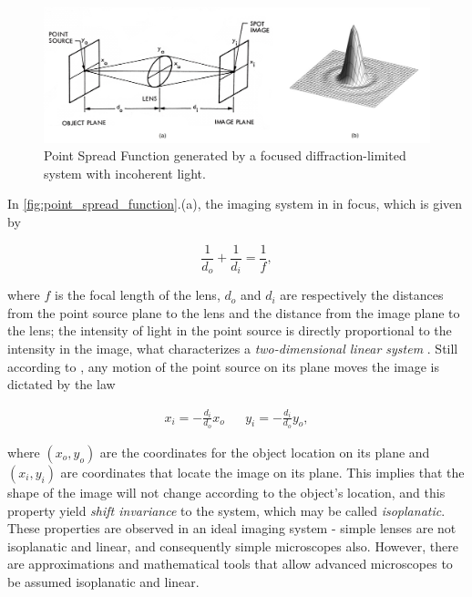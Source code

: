 \begin{figure}[htb]
	\centering
	\caption{\label{fig:point_spread_function} Point Spread Function generated by a focused diffraction-limited system with incoherent light.} 
	\begin{center}
	    \includegraphics[scale=0.235]{images/point_spread_function.jpeg}
	\end{center}
	\centering
\end{figure}

In \autoref{fig:point_spread_function}.(a), the imaging system in in focus, which is given by

\begin{equation}
\label{eqn:lens_focus}
\frac{1}{d_{o}} + \frac{1}{d_{i}} = \frac{1}{f},
\end{equation}

\noindent where $f$ is the focal length of the lens, $d_{o}$ and $d_{i}$ are respectively the distances from the point source plane to the lens and the distance from the image plane to the lens; the intensity of light in the point source is directly proportional to the intensity in the image, what characterizes a \emph{two-dimensional linear system} \cite{castleman1996digital}. Still according to , any motion of the point source on its plane moves the image is dictated by the law

\begin{align}
\label{eqn:isoplanatic_motion}
x_{i} = -\frac{d_{i}}{d_{o}}x_{o}
&&
y_{i} = -\frac{d_{i}}{d_{o}}y_{o},
\end{align}

\noindent where $(x_{o},y_{o})$ are the coordinates for the object location on its plane and $(x_{i},y_{i})$ are coordinates that locate the image on its plane. This implies that the shape of the image will not change according to the object's location, and this property yield \emph{shift invariance} to the system, which may be called \emph{isoplanatic}. These properties are observed in an ideal imaging system - simple lenses are not isoplanatic and linear, and  consequently simple microscopes also. However, there are approximations and mathematical tools that allow advanced microscopes to be assumed isoplanatic and linear.

